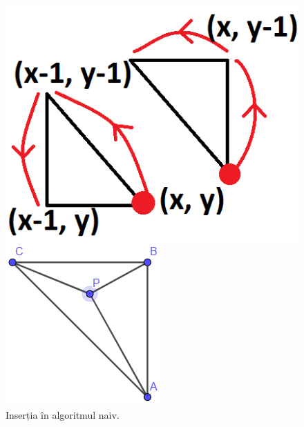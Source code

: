\documentclass[12pt]{article}
\begin{document}
\begin{figure}[!htb]
	\begin{minipage}{0.24\textwidth}
		\centering
		\includegraphics[width=.95\linewidth]{NaivaOrdine.PNG}
		\caption{Inserția în algoritmul naiv.}\label{fig:fig12}
	\end{minipage}\hfill
	\begin{minipage}{0.24\textwidth}
		\centering
		\includegraphics[width=.95\linewidth]{cazi.png}

\end{minipage}
\end{figure}
\end{document}
